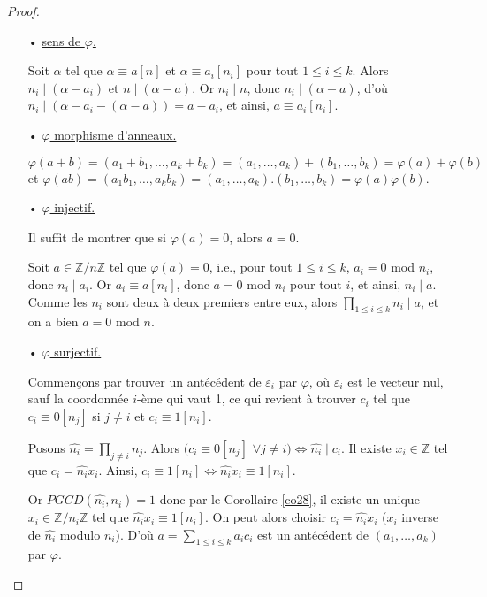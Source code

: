 \documentclass[10pt,a4paper]{report}
\begin{document}
\begin{proof}\
\begin{itemize}
\item[•] \underline{sens de $\varphi$.}\par 
Soit $\alpha$ tel que $\alpha \equiv a [n] $ et $\alpha \equiv a_i [n_i]$ pour tout $1 \leqslant i \leqslant k$. Alors $n_i \mid (\alpha -a_i) $ et $n \mid (\alpha -a)$. Or $n_i \mid n$, donc $n_i \mid (\alpha-a)$, d'où $n_i \mid (\alpha -a_i-(\alpha -a))=a-a_i$, et ainsi, $a \equiv a_i [n_i]$.
\item[•] \underline{$\varphi$ morphisme d'anneaux.}\par 
$\varphi(a+b)=(a_1+b_1, \ldots , a_k+b_k)=(a_1, \ldots , a_k)+(b_1, \ldots , b_k)=\varphi(a)+\varphi(b)$ et $  \varphi(ab)=(a_1 b_1, \ldots, a_k b_k)=(a_1, \ldots, a_k). (b_1, \ldots, b_k)=\varphi(a)\varphi(b) .  $
\item[•] \underline{$\varphi$ injectif.} \par 
Il suffit de montrer que si $\varphi(a)=0$, alors $a=0$.\par 
Soit $a \in \mathbb{Z}/n\mathbb{Z} $ tel que $\varphi(a)=0$, i.e., pour tout $1 \leqslant i \leqslant k$, $a_i=0$ mod $n_i$, donc $n_i \mid a_i$. Or $a_i \equiv a [n_i]$, donc $a=0$ mod $n_i$ pour tout $i$, et ainsi, $n_i \mid a$. Comme les $n_i$ sont deux à deux premiers entre eux, alors $\prod_{1 \leqslant i \leqslant k} n_i \mid a$, et on a bien $a=0$ mod $n$.
\item[•] \underline{$\varphi$ surjectif.} \par 
Commençons par trouver un antécédent de $\varepsilon_i$ par $\varphi$, où $\varepsilon_i$ est le vecteur nul, sauf la coordonnée $i$-ème qui vaut 1, ce qui revient à trouver $c_i$ tel que $ c_i \equiv 0 [n_j]$ si $j \neq i$ et $c_i \equiv 1 [n_i]$.\par 
Posons $ \widehat{n_i}= \prod_{j \neq i}n_j $. Alors $(c_i \equiv 0 [n_j]$ $\forall j \neq i) \Leftrightarrow \widehat{n_i} \mid c_i$. Il existe $x_i \in \mathbb{Z}$ tel que $c_i=\widehat{n_i} x_i$. Ainsi, $c_i \equiv 1 [n_i] \Leftrightarrow \widehat{n_i} x_i \equiv 1 [n_i]$. \par 
Or $PGCD(\widehat{n_i},n_i)=1$ donc par le Corollaire \ref{co28}, il existe un unique $x_i \in \mathbb{Z}/n_i\mathbb{Z} $ tel que $\widehat{n_i}x_i\equiv 1 [n_i]$. On peut alors choisir $c_i=\widehat{n_i}x_i $ ($x_i$ inverse de $\widehat{n_i}$ modulo $n_i$). D'où $a= \sum_{1 \leqslant i \leqslant k}a_i c_i$ est un antécédent de $(a_1, \ldots , a_k)$ par $\varphi$.
 \end{itemize}
\end{proof}
\end{document}
